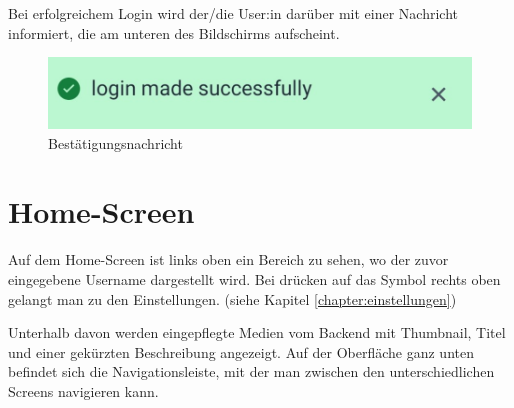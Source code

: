 Bei erfolgreichem Login wird der/die User:in darüber mit einer Nachricht informiert, die am unteren des Bildschirms
aufscheint.

\begin{figure}[H]
    \centering
    \includegraphics[height=0.09\textwidth]{./pics/message_cut.jpg}
    \caption{Bestätigungsnachricht}
\end{figure}

\section{Home-Screen}

Auf dem Home-Screen ist links oben ein Bereich zu sehen, wo der zuvor eingegebene Username dargestellt wird. Bei drücken
auf das Symbol rechts
oben gelangt man zu den Einstellungen. (siehe Kapitel \ref{chapter:einstellungen})

Unterhalb davon werden eingepflegte Medien vom Backend mit Thumbnail, Titel und einer gekürzten Beschreibung angezeigt.
Auf der Oberfläche ganz unten befindet sich die Navigationsleiste, mit der man zwischen den unterschiedlichen Screens
navigieren kann.


